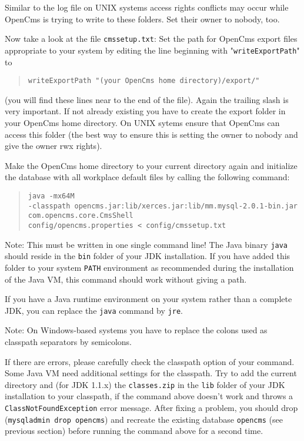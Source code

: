 Similar to the log file on UNIX systems access rights conflicts may occur while
OpenCms is trying to write to these folders. Set their owner to nobody, too.

Now take a look at the file \texttt{cmssetup.txt}:
Set the path for OpenCms export files appropriate to your system by editing
the line beginning with "\texttt{writeExportPath}" to 

\begin{quote}
\texttt{writeExportPath "(your OpenCms home directory)/export/"}
\end{quote}

(you will find these lines near to the end of the file).
Again the trailing slash is very important.
If not already existing you have to create the export folder in your OpenCms home
directory. On UNIX sytems ensure that OpenCms can access this folder
(the best way to ensure this is setting the owner to nobody and give
the owner rwx rights). 

Make the OpenCms home directory to your current directory again and
initialize the database with all workplace default files by calling the following command:

\begin{quote}
\texttt{java -mx64M \\
-classpath opencms.jar:lib/xerces.jar:lib/mm.mysql-2.0.1-bin.jar\\
com.opencms.core.CmsShell\\
config/opencms.properties < config/cmssetup.txt}
\end{quote}

Note: This must be written in one single command line! The Java binary \texttt{java} should 
reside in the \texttt{bin} folder of your JDK installation. If you have added this folder to your 
system \texttt{PATH} environment as recommended during the installation of the Java VM,
this command should work without giving a path.

If you have a Java runtime environment 
on your system rather than a complete JDK, you
can replace the \texttt{java} command by \texttt{jre}.

Note: On Windows-based systems you have to replace the colons used as classpath separators 
by semicolons.

If there are errors, please carefully check the classpath option of your command.
Some Java VM need additional settings for the classpath. Try to add the current directory 
and (for JDK 1.1.x) the \texttt{classes.zip} in the \texttt{lib} folder of your JDK installation to your 
classpath, if the command above doesn't work and throws a \texttt{ClassNotFoundException} error message.
After fixing a problem, you should drop (\texttt{mysqladmin drop opencms}) and recreate 
the existing database \texttt{opencms} (see previous section) before 
running the command above for a second time.

